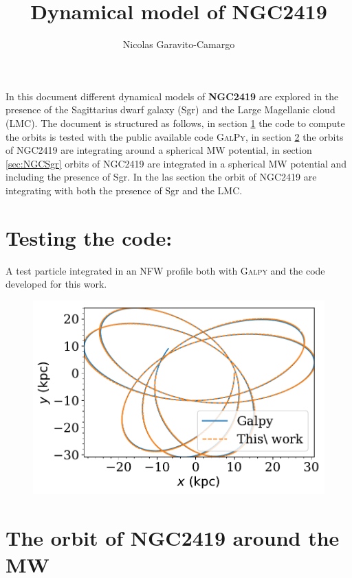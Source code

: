 \documentclass[14pt]{article}
\title{Dynamical model of NGC2419}
\author{Nicolas Garavito-Camargo}
\begin{document}
\maketitle


In this document different dynamical models of \textbf{NGC2419} are explored
in the presence of the Sagittarius dwarf galaxy (Sgr) and the Large
Magellanic cloud (LMC). The document is structured as follows, in section
\ref{sec:test} the code to compute the orbits is tested with the
public available code \textsc{GalPy}, in section \ref{sec:NGC} the
orbits of NGC2419 are integrating around a spherical MW potential,
in section \ref{sec:NGCSgr} orbits of NGC2419 are integrated in a
spherical MW potential and including the presence of Sgr.
 In the las section the orbit of NGC2419 are integrating
with both the presence of Sgr and the LMC.

\section{Testing the code:}\label{sec:test}

A test particle integrated in an NFW profile both with \textsc{Galpy}
and the code developed for this work.

\begin{figure}[H]
\centering
\includegraphics[scale=0.5]{../exploratory_code/galpy_test.pdf}
\end{figure}


\section{The orbit of NGC2419 around the MW}\label{sec:NGC}
\end{document}
